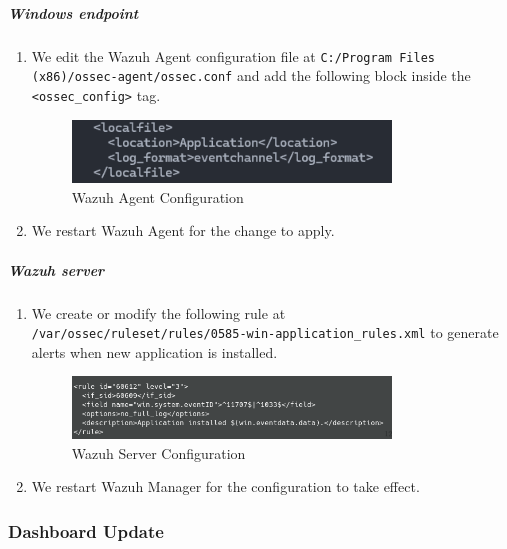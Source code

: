 \subparagraph{Windows endpoint}
\begin{enumerate}
    \item We edit the Wazuh Agent configuration file at \texttt{C:/Program Files (x86)/ossec-agent/ossec.conf} and add the following block inside the \texttt{<ossec\_config>} tag.
    \begin{figure} [H]
    \centering
    \includegraphics[width=0.8\textwidth]{images/log-data/9.png}
    \caption{Wazuh Agent Configuration}
    \end{figure}
    \item We restart Wazuh Agent for the change to apply.
\end{enumerate}

\subparagraph{Wazuh server}
\begin{enumerate}
    \item We create or modify the following rule at \\ \texttt{/var/ossec/ruleset/rules/0585-win-application\_rules.xml} to generate alerts when new application is installed.
    \begin{figure} [H]
    \centering
    \includegraphics[width=0.8\textwidth]{images/log-data/10.png}
    \caption{Wazuh Server Configuration}
    \end{figure}
    \item We restart Wazuh Manager for the configuration to take effect.
\end{enumerate}

\subsubsection{Dashboard Update}
